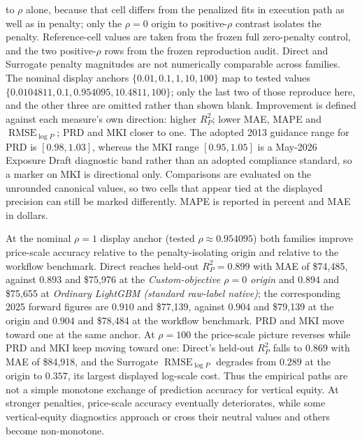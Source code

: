 \documentclass[10pt]{article}
\theoremstyle{definition}
\newcommand{\1}{\mathbf{1}}
\begin{document}
{\begin{table}[!htbp]
\begin{minipage}{\textwidth}
to $\rho$ alone, because that cell differs from the penalized fits in execution path as well as in
penalty; only the $\rho=0$ origin to positive-$\rho$ contrast isolates the penalty. Reference-cell
values are taken from the frozen full zero-penalty control, and the two positive-$\rho$ rows from the
frozen reproduction audit. Direct and Surrogate penalty magnitudes are not numerically comparable
across families. The nominal display anchors $\{0.01,0.1,1,10,100\}$ map to tested values
$\{0.0104811,0.1,0.954095,10.4811,100\}$; only the last two of those reproduce here, and the other
three are omitted rather than shown blank.
Improvement is defined against each measure's own direction: higher $R^2_P$; lower MAE, MAPE and
$\operatorname{RMSE}_{\log P}$; PRD and MKI closer to one. The adopted 2013 guidance range for PRD is
$[0.98,1.03]$, whereas the MKI range $[0.95,1.05]$ is a May-2026 Exposure Draft diagnostic band rather
than an adopted compliance standard, so a marker on MKI is directional only. Comparisons are evaluated
on the unrounded canonical values, so two cells that appear tied at the displayed precision can still
be marked differently. MAPE is reported in percent and MAE in dollars.
\end{minipage}
\end{table}
}

At the nominal $\rho=1$ display anchor (tested $\rho\approx 0.954095$) both families improve
price-scale accuracy relative to the penalty-isolating origin and relative to the workflow benchmark.
Direct reaches held-out $R^2_P=0.899$ with MAE of \$74,485, against $0.893$ and \$75,976 at the
\emph{Custom-objective $\rho=0$ origin} and $0.894$ and \$75,655 at \emph{Ordinary LightGBM (standard
raw-label native)}; the corresponding 2025 forward figures are $0.910$ and \$77,139, against $0.904$
and \$79,139 at the origin and $0.904$ and \$78,484 at the workflow benchmark. PRD and MKI move toward
one at the same anchor. At $\rho=100$ the price-scale picture reverses while PRD and MKI keep moving
toward one: Direct's held-out $R^2_P$ falls to $0.869$ with MAE of \$84,918, and the Surrogate
$\operatorname{RMSE}_{\log P}$ degrades from $0.289$ at the origin to $0.357$, its largest displayed
log-scale cost.
Thus the empirical paths are not a simple monotone exchange of prediction accuracy for vertical equity. At stronger penalties, price-scale accuracy eventually deteriorates, while some vertical-equity diagnostics approach or cross their neutral values and others become non-monotone.
\end{document}
